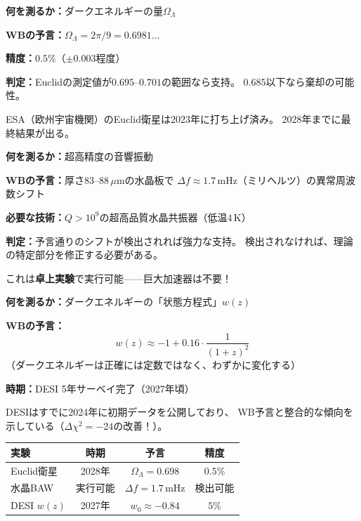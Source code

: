 \documentclass[12pt,a4paper]{article}
\begin{document}
\begin{testbox}[実験1：Euclid衛星（2028年）]
\textbf{何を測るか：}ダークエネルギーの量$\Omega_\Lambda$

\textbf{WBの予言：}$\Omega_\Lambda = 2\pi/9 = 0.6981\ldots$

\textbf{精度：}$0.5\%$（$\pm 0.003$程度）

\textbf{判定：}Euclidの測定値が$0.695$--$0.701$の範囲なら支持。
$0.685$以下なら棄却の可能性。

ESA（欧州宇宙機関）のEuclid衛星は2023年に打ち上げ済み。
2028年までに最終結果が出る。
\end{testbox}

\begin{testbox}[実験2：水晶BAW共振器]
\textbf{何を測るか：}超高精度の音響振動

\textbf{WBの予言：}厚さ$83$--$88\,\mu$mの水晶板で
$\Delta f \approx 1.7\,$mHz（ミリヘルツ）の異常周波数シフト

\textbf{必要な技術：}$Q > 10^9$の超高品質水晶共振器（低温$4\,$K）

\textbf{判定：}予言通りのシフトが検出されれば強力な支持。
検出されなければ、理論の特定部分を修正する必要がある。

これは\textbf{卓上実験}で実行可能——巨大加速器は不要！
\end{testbox}

\begin{testbox}
\textbf{何を測るか：}ダークエネルギーの「状態方程式」$w(z)$

\textbf{WBの予言：}
\[
  w(z) \approx -1 + 0.16 \cdot \frac{1}{(1+z)^2}
\]
（ダークエネルギーは正確には定数ではなく、わずかに変化する）

\textbf{時期：}DESI 5年サーベイ完了（2027年頃）

DESIはすでに2024年に初期データを公開しており、
WB予言と整合的な傾向を示している（$\Delta\chi^2 = -24$の改善！）。
\end{testbox}

\begin{center}
\begin{tabular}{lccc}
\toprule
\textbf{実験} & \textbf{時期} & \textbf{予言} & \textbf{精度} \\
\midrule
Euclid衛星     & 2028年 & $\Omega_\Lambda = 0.698$ & $0.5\%$ \\
水晶BAW        & 実行可能 & $\Delta f = 1.7\,$mHz & 検出可能 \\
DESI $w(z)$    & 2027年 & $w_0 \approx -0.84$ & $5\%$ \\
\bottomrule
\end{tabular}
\end{center}
\end{document}
